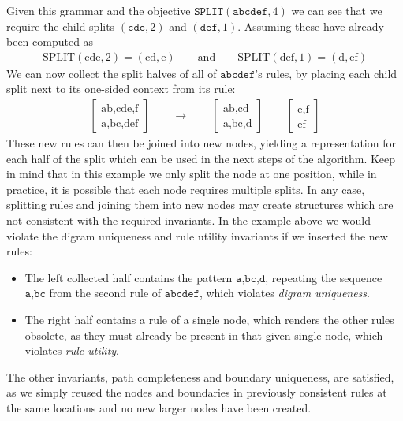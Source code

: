 \noindent
Given this grammar and the objective $\texttt{SPLIT}(\texttt{abcdef}, {4})$ we can see that we require the child splits $(\texttt{cde}, 2)$ and $(\texttt{def}, 1)$. Assuming these have already been computed as
%
{
    \ttfamily
    \noindent
    \begin{align*}
        \text{SPLIT}(\text{cde}, 2) = (\text{cd}, \text{e})
        \qquad
        \textrm{and}
        \qquad
        \text{SPLIT}(\text{def}, 1) = (\text{d}, \text{ef})
    \end{align*}
}\linebreak
We can now collect the split halves of all of $\texttt{abcdef}$'s rules, by placing each child split next to its one-sided context from its rule:
%
{
    \ttfamily
    \noindent
    \begin{align*}
        \begin{bmatrix}
            \text{ab,cde,f}\\
            \text{a,bc,def}
        \end{bmatrix}
        \qquad
        \longrightarrow
        \qquad
        \begin{bmatrix}
            \text{ab,cd}\\
            \text{a,bc,d}
        \end{bmatrix}
        \qquad
        \begin{bmatrix}
            \text{e,f}\\
            \text{ef}
        \end{bmatrix}
    \end{align*}
}\linebreak
These new rules can then be joined into new nodes, yielding a representation for each half of the split which can be used in the next steps of the algorithm. Keep in mind that in this example we only split the node at one position, while in practice, it is possible that each node requires multiple splits.
\bigbreak%
\noindent
In any case, splitting rules and joining them into new nodes may create structures which are not consistent with the required invariants. In the example above we would violate the digram uniqueness and rule utility invariants if we inserted the new rules:

\begin{itemize}
    \item The left collected half contains the pattern $\texttt{a,bc,d}$, repeating the sequence $\texttt{a,bc}$ from the second rule of $\texttt{abcdef}$, which violates \textit{digram uniqueness}.
    \item The right half contains a rule of a single node, which renders the other rules obsolete, as they must already be present in that given single node, which violates \textit{rule utility}.
\end{itemize}
The other invariants, path completeness and boundary uniqueness, are satisfied, as we simply reused the nodes and boundaries in previously consistent rules at the same locations and no new larger nodes have been created.

